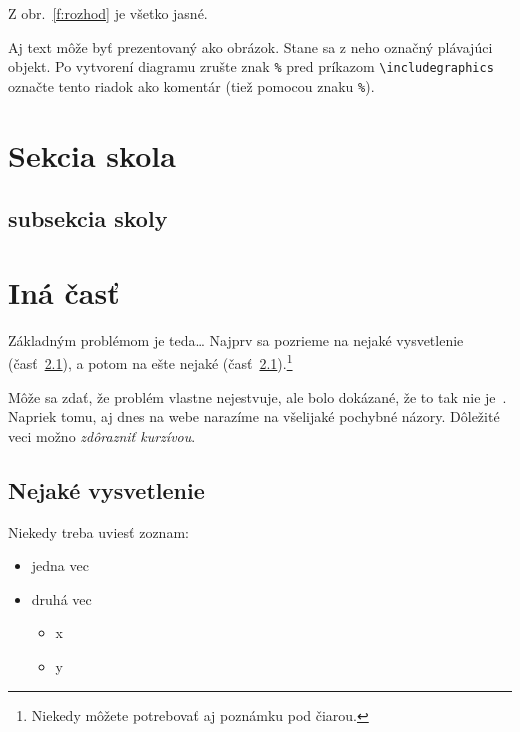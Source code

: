 \documentclass[10pt,twoside,slovak,a4paper]{coursepaper}
\begin{document}
Z obr.~\ref{f:rozhod} je všetko jasné. 

\begin{figure*}[tbh]
\centering
Aj text môže byť prezentovaný ako obrázok. Stane sa z neho označný plávajúci objekt. Po vytvorení diagramu zrušte znak \texttt{\%} pred príkazom \verb|\includegraphics| označte tento riadok ako komentár (tiež pomocou znaku \texttt{\%}).
\caption{Rozhodujúci argument.}
\label{f:rozhod}
\end{figure*}

\section{Sekcia skola}
\subsection{subsekcia skoly}


\cite{Coplien:MPD}

\section{Iná časť} \label{ina}

Základným problémom je teda\ldots{} Najprv sa pozrieme na nejaké vysvetlenie (časť~\ref{ina:nejake}), a potom na ešte nejaké (časť~\ref{ina:nejake}).\footnote{Niekedy môžete potrebovať aj poznámku pod čiarou.}

Môže sa zdať, že problém vlastne nejestvuje\cite{Coplien:MPD}, ale bolo dokázané, že to tak nie je~\cite{Czarnecki:Staged, Czarnecki:Progress}. Napriek tomu, aj dnes na webe narazíme na všelijaké pochybné názory\cite{PLP-Framework}. Dôležité veci možno \emph{zdôrazniť kurzívou}.


\subsection{Nejaké vysvetlenie} \label{ina:nejake}

Niekedy treba uviesť zoznam:

\begin{itemize}
\item jedna vec
\item druhá vec
	\begin{itemize}
	\item x
	\item y
	\end{itemize}
\end{itemize}
\end{document}

